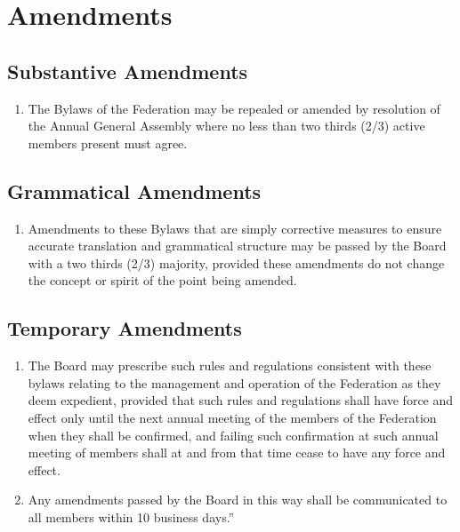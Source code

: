 \section{Amendments}
\label{amendments}

\subsection{Substantive Amendments}
\label{substantive-amendments}

\begin{enumerate}
 \item
  The Bylaws of the Federation may be repealed or amended by resolution of the Annual General Assembly where no less than two thirds (2/3) active members present must agree.
\end{enumerate}

\subsection{Grammatical Amendments}
\label{grammatical-amendments}

\begin{enumerate}
 \item
  Amendments to these Bylaws that are simply corrective measures to ensure accurate translation and grammatical structure may be passed by the Board with a two thirds (2/3) majority, provided these amendments do not change the concept or spirit of the point being amended.
\end{enumerate}

\subsection{Temporary Amendments}
\label{temporary-amendments}

\begin{enumerate}
 \item
  The Board may prescribe such rules and regulations consistent with these bylaws relating to the management and operation of the Federation as they deem expedient, provided that such rules and regulations shall have force and effect only until the next annual meeting of the members of the Federation when they shall be confirmed, and failing such confirmation at such annual meeting of members shall at and from that time cease to have any force and effect.
 \item
  Any amendments passed by the Board in this way shall be communicated to all members within 10 business days.”
\end{enumerate}

